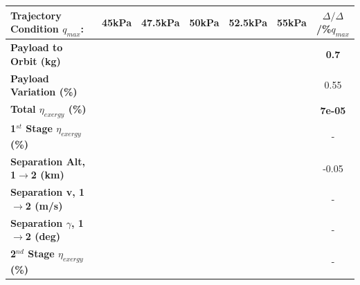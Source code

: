 \begin{table}[ht]%
	\centering
	\begin{tabular}{l c c c c c c} 
		\hline \textbf{Trajectory Condition}   \qquad  $q_{max}$:
		&45kPa
		&47.5kPa
		&50kPa
		&52.5kPa
		&55kPa
		& $\Delta/\Delta$/\%$q_{max}$
		\\
		\hline \textbf{Payload to Orbit (kg)}
		& \textbf{\PayloadToOrbitqForty}
		& \textbf{\PayloadToOrbitqFortyFive}
		& \textbf{\PayloadToOrbitqStandard}
		& \textbf{\PayloadToOrbitqFiftyFive}
		& \textbf{\PayloadToOrbitqSixty}
		&\textbf{0.7}
		\\
		\textbf{Payload Variation (\%)}
		& \PayloadVarqForty
		& \PayloadVarqFortyFive
		& \PayloadVarqStandard
		& \PayloadVarqFiftyFive
		& \PayloadVarqSixty
		&0.55
		\\
		\textbf{Total $\eta_{exergy}$ (\%)}
		& \textbf{\totalExergyEffqForty}
		& \textbf{\totalExergyEffqFortyFive}
		& \textbf{\totalExergyEffqStandard}
		& \textbf{\totalExergyEffqFiftyFive}
		& \textbf{\totalExergyEffqSixty}
		& \textbf{7e-05}
		\\
		\hline 
		\textbf{1$^{st}$ Stage $\eta_{exergy}$ (\%)}
		& \textbf{\firstExergyEffqForty}
		& \textbf{\firstExergyEffqFortyFive}
		& \textbf{\firstExergyEffqStandard}
		& \textbf{\firstExergyEffqFiftyFive}
		& \textbf{\firstExergyEffqSixty}
		& -
		\\
		\textbf{Separation Alt, 1$\rightarrow$2 (km)}
		& \firstsecondSeparationAltqForty
		& \firstsecondSeparationAltqFortyFive
		& \firstsecondSeparationAltqStandard
		& \firstsecondSeparationAltqFiftyFive
		& \firstsecondSeparationAltqSixty
		&-0.05
		\\
		\textbf{Separation v, 1$\rightarrow$2 (m/s)}
		& \firstsecondSeparationvqForty
		& \firstsecondSeparationvqFortyFive
		& \firstsecondSeparationvqStandard
		& \firstsecondSeparationvqFiftyFive
		& \firstsecondSeparationvqSixty
		& -
		\\
		\textbf{Separation $\gamma$, 1$\rightarrow$2 (deg)}
		& \firstsecondSeparationgammaqForty
		& \firstsecondSeparationgammaqFortyFive
		& \firstsecondSeparationgammaqStandard
		& \firstsecondSeparationgammaqFiftyFive
		& \firstsecondSeparationgammaqSixty
		& -
		\\
		\hline 
		\textbf{2$^{nd}$ Stage $\eta_{exergy}$ (\%)}
		& \textbf{\secondExergyEffqForty}
		& \textbf{\secondExergyEffqFortyFive}
		& \textbf{\secondExergyEffqStandard}
		& \textbf{\secondExergyEffqFiftyFive}
		& \textbf{\secondExergyEffqSixty}
		& -
		\\

\end{tabular}
\end{table}
